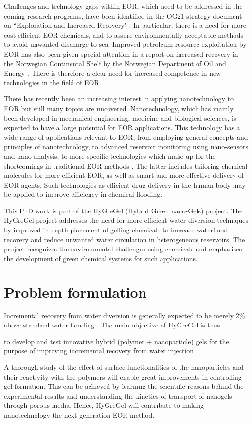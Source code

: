 Challenges and technology gaps within EOR,  which need to be addressed in the coming research programs, have been identified in the OG21 strategy document on ``Exploration and Increased Recovery" \citep{OG21}: In particular, there is a need for more cost-efficient EOR chemicals, and to assure environmentally acceptable methods to avoid unwanted discharge to sea. Improved petroleum resource exploitation by EOR has also been given special attention in a report on increased recovery in the Norwegian Continental Shelf by the Norwegian Department of Oil and Energy \citep{Am2010}. There is therefore a clear need for increased competence in new technologies in the field of EOR. 

There has recently been an increasing interest in applying nanotechnology to EOR but still many topics are uncovered. Nanotechnology,  which has mainly been developed in mechanical engineering, medicine and biological sciences, is expected to have a large potential for EOR applications. This technology has a wide range of applications relevant to EOR, from employing general concepts and principles of nanotechnology, to advanced reservoir monitoring using nano-sensors and nano-analysis, to more specific technologies which make up for the shortcomings in traditional EOR methods \citep{Fletcher2010, Ayatollahi2012, Cocuzza2011}. The latter includes tailoring chemical molecules for more efficient EOR, as well as smart and more effective delivery of EOR agents. Such technologies as efficient drug delivery in the human body may be applied to improve efficiency in chemical flooding.

This PhD work is part of the HyGreGel (Hybrid Green nano-Gels) project. The HyGreGel project addresses the need for more efficient water diversion techniques by improved in-depth placement of gelling chemicals to increase waterflood recovery and reduce unwanted water circulation in heterogeneous reservoirs. The project recognizes the environmental challenges using chemicals and emphasizes the development of green chemical systems for such applications.
\section{Problem formulation}

Incremental recovery from water diversion is generally expected to be merely 2\% above standard water flooding \citep{OG21}. The main objective of HyGreGel is thus 
\begin{tcolorbox}
to develop and test innovative hybrid (polymer + nanoparticle) gels for the purpose of improving incremental recovery from water injection
\end{tcolorbox}
A thorough study of the effect of surface functionalities of the nanoparticles and their reactivity with the polymers will enable great improvements in controlling gel formation. This can be achieved by learning the scientific reasons behind the experimental results and understanding the kinetics of transport of nanogels through porous media. Hence,  HyGreGel will contribute to making nanotechnology the next-generation EOR method.

